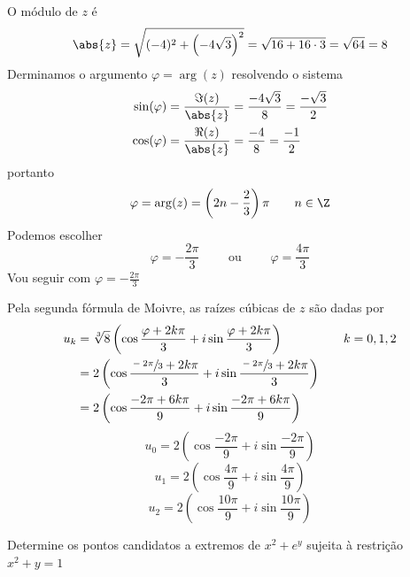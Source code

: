 \documentclass[a4paper,12pt,fleqn]{article}
\begin{document}
\begin{answer}
O módulo de $z$ é
\[
    \abs{z}
    = \sqrt{(-4)^2 + \left(-4\sqrt{3}\right)^2}
    = \sqrt{16 + 16\cdot 3}
    = \sqrt{64}
    = 8
\]
Derminamos o argumento \(\varphi = \arg(z)\) resolvendo o sistema
\begin{align*}
    \sin(\varphi) & = \frac{\Im(z)}{\abs{z}} = \frac{-4\sqrt{3}}{8} = \frac{-\sqrt{3}}{2} \\
    \cos(\varphi) & = \frac{\Re(z)}{\abs{z}} = \frac{-4}{8} = \frac{-1}{2}
\end{align*}
portanto
\[
    \varphi = \arg(z) = \left(2n - \frac{2}{3}\right)\pi \qquad n\in\Z
\]
Podemos escolher
\[
  \varphi = -\frac{2\pi}{3}
  \qquad\text{ ou }\qquad
  \varphi = \frac{4\pi}{3}
\]
Vou seguir com
\(
  \varphi = -\frac{2\pi}{3}
\)

Pela segunda fórmula de Moivre, as raízes cúbicas de $z$ são dadas por
\begin{align*}
    u_k
    & = \sqrt[3]{8}\left(\cos\frac{\varphi+2k\pi}{3}
                      + i\sin\frac{\varphi+2k\pi}{3}\right) & & \quad k = 0, 1, 2 \\
    & = 2 \left(\cos\frac{\sfrac{-2\pi}{3}+2k\pi}{3}
             + i\sin\frac{\sfrac{-2\pi}{3}+2k\pi}{3}\right)\\
    & = 2 \left(\cos\frac{-2\pi+6k\pi}{9}
             + i\sin\frac{-2\pi+6k\pi}{9}\right)
\end{align*}
\[
    u_0=2\left(\cos\frac{-2\pi}{9}+i\sin\frac{-2\pi}{9}\right)
\]
\[
    u_1=2\left(\cos\frac{4\pi}{9}+i\sin\frac{4\pi}{9}\right)
\]
\[
    u_2=2\left(\cos\frac{10\pi}{9}+i\sin\frac{10\pi}{9}\right)
\]
\end{answer}


Determine os pontos candidatos a extremos de
\(
  x^2+e^{y}
\)
sujeita à restrição
\(
  x^2+y=1
\)
\clearpagequestiononly
\end{document}
